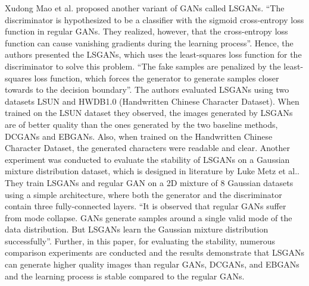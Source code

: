 Xudong Mao et al.\cite{mao2017squares} proposed another variant of \acp{GAN} called \acp{LSGAN}. ``The discriminator is hypothesized to be a classifier with the sigmoid cross-entropy loss function in regular \acp{GAN}. They realized, however, that the cross-entropy loss function can cause vanishing gradients during the learning process''\cite{mao2017squares}. Hence, the authors presented the \acp{LSGAN}, which uses the least-squares loss function for the discriminator to solve this problem. ``The fake samples are penalized by the least-squares loss function, which forces the generator to generate samples closer towards to the decision boundary''\cite{mao2017squares}. The authors evaluated \acp{LSGAN} using two datasets LSUN\cite{yu2016lsun} and HWDB1.0 (Handwritten Chinese Character Dataset)\cite{6065551}. When trained on the LSUN dataset\cite{yu2016lsun} they observed, the images generated by \acp{LSGAN} are of better quality than the ones generated by the two baseline methods, \acp{DCGAN}\cite{radford2016unsupervised} and EBGANs\cite{zhao2017energybased}. Also, when trained on the Handwritten Chinese Character Dataset, the generated characters were readable and clear. Another experiment was conducted to evaluate the stability of \acp{LSGAN} on a Gaussian mixture distribution dataset, which is designed in literature by Luke Metz et al.\cite{metz2017unrolled}. They train \acp{LSGAN} and regular \ac{GAN} on a 2D mixture of 8 Gaussian datasets using a simple architecture, where both the generator and the discriminator contain three fully-connected layers. ``It is observed that regular \acp{GAN} suffer from mode collapse. \acp{GAN} generate samples around a single valid mode of the data distribution. But \acp{LSGAN} learn the Gaussian mixture distribution successfully''\cite{mao2017squares}. Further, in this paper, for evaluating the stability, numerous comparison experiments are conducted and the results demonstrate that \acp{LSGAN} can generate higher quality images than regular \acp{GAN}, \acp{DCGAN}\cite{radford2016unsupervised}, and \acp{EBGAN}\cite{zhao2017energybased} and the learning process is stable compared to the regular \acp{GAN}.


